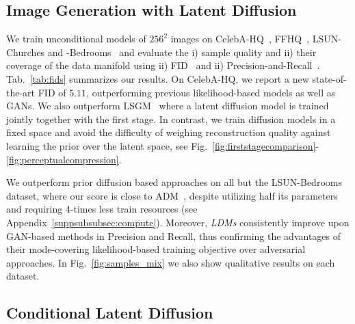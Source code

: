 \documentclass[10pt,twocolumn,letterpaper]{article}
\begin{document}
\subsection{Image Generation with Latent Diffusion}
%
\label{subsec:uncond2img}
\vspace{-0.5em}
We train unconditional models of $256^2$ images on
CelebA-HQ~\cite{DBLP:journals/corr/abs-1710-10196}, FFHQ~\cite{stylegan},
LSUN-Churches and \mbox{-Bedrooms}~\cite{DBLP:journals/corr/YuZSSX15} 
and evaluate the i) sample quality and ii) their coverage of the data manifold using ii) FID~\cite{FID} and ii) Precision-and-Recall~\cite{DBLP:journals/corr/abs-1904-06991}. Tab.~\ref{tab:fids} summarizes our results. %
On CelebA-HQ, we report a new state-of-the-art FID of $5.11$, outperforming
previous likelihood-based models as well as GANs. We also outperform
LSGM~\cite{DBLP:journals/corr/abs-2106-05931} where a latent diffusion model is
trained jointly together with the first stage. 
In contrast, we train diffusion models in a fixed space and avoid the
difficulty of weighing reconstruction quality against learning the prior over
the latent space, see Fig.~\ref{fig:firststagecomparison}-\ref{fig:perceptualcompression}.
%
%

We outperform prior diffusion based approaches on all but the LSUN-Bedrooms
dataset, where our score is close to
ADM~\cite{DBLP:journals/corr/abs-2105-05233}, despite utilizing half its
parameters and requiring 4-times less train resources (see Appendix~\ref{suppsubsubsec:compute}). 
Moreover, \emph{LDMs} consistently improve upon GAN-based methods in Precision and Recall, thus confirming the advantages of their mode-covering likelihood-based training objective over adversarial approaches.
%
In Fig.~\ref{fig:samples_mix} we also show qualitative results on each dataset.

\subsection{Conditional Latent Diffusion}
\label{subsec:conditionallatentdiffusion}
\bboxandtexttoimgsamples
%
\end{document}
